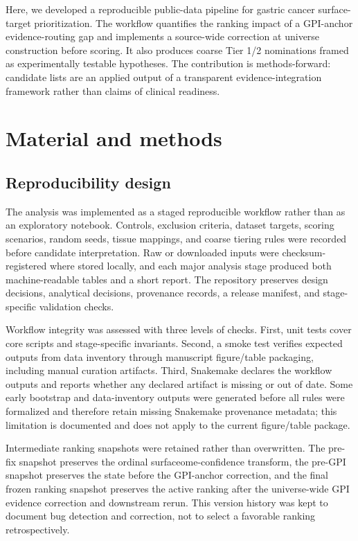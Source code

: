 \documentclass[twocolumn]{article}
\begin{document}
Here, we developed a reproducible public-data pipeline for gastric cancer surface-target prioritization. The workflow quantifies the ranking impact of a GPI-anchor evidence-routing gap and implements a source-wide correction at universe construction before scoring. It also produces coarse Tier 1/\allowbreak{}2 nominations framed as experimentally testable hypotheses. The contribution is methods-forward: candidate lists are an applied output of a transparent evidence-integration framework rather than claims of clinical readiness.

\section{Material and methods}

\subsection{Reproducibility design}

The analysis was implemented as a staged reproducible workflow rather than as an exploratory notebook. Controls, exclusion criteria, dataset targets, scoring scenarios, random seeds, tissue mappings, and coarse tiering rules were recorded before candidate interpretation. Raw or downloaded inputs were checksum-registered where stored locally, and each major analysis stage produced both machine-readable tables and a short report. The repository preserves design decisions, analytical decisions, provenance records, a release manifest, and stage-specific validation checks.

Workflow integrity was assessed with three levels of checks. First, unit tests cover core scripts and stage-specific invariants. Second, a smoke test verifies expected outputs from data inventory through manuscript figure/\allowbreak{}table packaging, including manual curation artifacts. Third, Snakemake declares the workflow outputs and reports whether any declared artifact is missing or out of date. Some early bootstrap and data-inventory outputs were generated before all rules were formalized and therefore retain missing Snakemake provenance metadata; this limitation is documented and does not apply to the current figure/\allowbreak{}table package.

Intermediate ranking snapshots were retained rather than overwritten. The pre-fix snapshot preserves the ordinal surfaceome-confidence transform, the pre-GPI snapshot preserves the state before the GPI-anchor correction, and the final frozen ranking snapshot preserves the active ranking after the universe-wide GPI evidence correction and downstream rerun. This version history was kept to document bug detection and correction, not to select a favorable ranking retrospectively.
\end{document}
